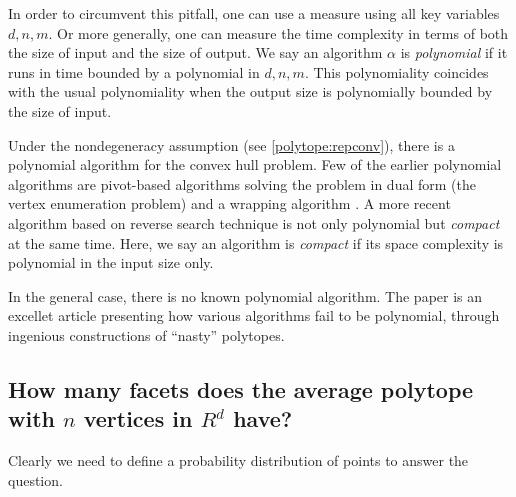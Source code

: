 \documentclass[[a4paper,12pt]{article}
\begin{document}
In order to circumvent this pitfall, one can use a measure using
all key variables $d, n, m$.   Or more generally, one can
measure the time complexity in terms of both the size of
input and the size of output.
  We say an algorithm $\alpha$ is {\em polynomial\/}
if it runs in time bounded by a polynomial in $d, n, m$.
This polynomiality coincides with the usual polynomiality
when the output size is polynomially bounded by the size of
input.

Under the nondegeneracy assumption (see \ref{polytope:repconv}),
there is a polynomial algorithm for the convex hull problem.
Few of the earlier polynomial algorithms are pivot-based
algorithms \cite{cch-itlp-53,d-cvem-83}
solving the problem in dual form (the vertex enumeration problem)
and a wrapping algorithm \cite{ck-acp-70}.
A more recent algorithm \cite{af-pachv-92} based on reverse search technique
\cite{af-rse-96} is not only polynomial but {\em compact\/} at 
the same time.  Here, we say an algorithm is {\em compact\/} if its
space complexity is polynomial in the input size only.

In the general case, there is no known polynomial algorithm.
The paper \cite{abs-hgach-97} is an excellet article presenting
how various algorithms fail to be polynomial, through ingenious
constructions of ``nasty'' polytopes.

\subsection{How many facets does the average polytope with $n$ vertices in
$R^d$ have?}
\label{polytope:expectedHcomplexity}

Clearly we need to define a probability distribution of
points to answer the question.
\end{document}
